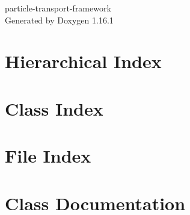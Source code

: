 \documentclass[twoside]{book}
\newcommand{\+}{\discretionary{\mbox{\scriptsize$\hookleftarrow$}}{}{}}
\newcommand{\clearemptydoublepage}{%
    \newpage{\pagestyle{empty}\cleardoublepage}%
  }
\begin{document}
  \raggedbottom
    \hypersetup{pageanchor=false,
                bookmarksnumbered=true,
                pdfencoding=unicode
               }
  \begin{titlepage}
  \vspace*{7cm}
  \begin{center}%
  {\Large particle-\/transport-\/framework}\\
  \vspace*{1cm}
  {\large Generated by Doxygen 1.16.1}\\
  \end{center}
  \end{titlepage}
  \clearemptydoublepage
  \tableofcontents
  \clearemptydoublepage
  \hypersetup{pageanchor=true}

\chapter{Hierarchical Index}

\chapter{Class Index}

\chapter{File Index}

\chapter{Class Documentation}





































\end{document}
